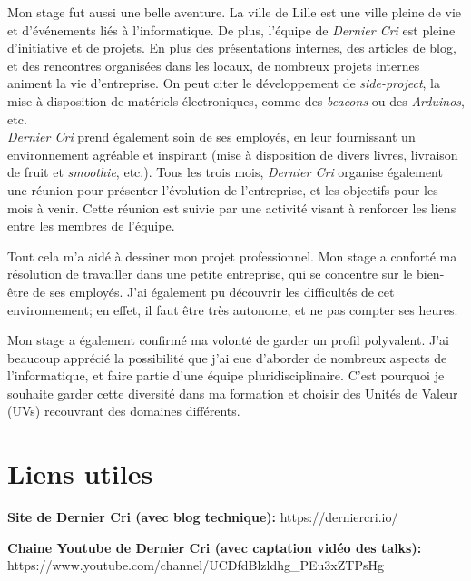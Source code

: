 \documentclass[12pt,a4paper]{article}
\begin{document}
  \bigskip

  Mon stage fut aussi une belle aventure. La ville de Lille est une ville
  pleine de vie et d'événements liés à l'informatique. De plus, l'équipe
  de \emph{Dernier Cri} est pleine d'initiative et de projets. En plus des
  présentations internes, des articles de blog, et des rencontres
  organisées dans les locaux, de nombreux projets internes animent la vie
  d'entreprise. On peut citer le développement de \emph{side-project}, la
  mise à disposition de matériels électroniques, comme des \emph{beacons}
  ou des \emph{Arduinos}, etc.\\
  \emph{Dernier Cri} prend également soin de ses employés, en leur
  fournissant un environnement agréable et inspirant (mise à disposition
  de divers livres, livraison de fruit et \emph{smoothie}, etc.). Tous les
  trois mois, \emph{Dernier Cri} organise également une réunion pour
  présenter l'évolution de l'entreprise, et les objectifs pour les mois à
  venir. Cette réunion est suivie par une activité visant à renforcer les
  liens entre les membres de l'équipe.

  \bigskip

  Tout cela m'a aidé à dessiner mon projet professionnel. Mon stage a
  conforté ma résolution de travailler dans une petite entreprise, qui se
  concentre sur le bien-être de ses employés. J'ai également pu découvrir
  les difficultés de cet environnement; en effet, il faut être très
  autonome, et ne pas compter ses heures.

  \bigskip

  Mon stage a également confirmé ma volonté de garder un profil
  polyvalent. J'ai beaucoup apprécié la possibilité que j'ai eue d'aborder
  de nombreux aspects de l'informatique, et faire partie d'une équipe
  pluridisciplinaire. C'est pourquoi je souhaite garder cette diversité
  dans ma formation et choisir des Unités de Valeur (UVs) recouvrant des
  domaines différents.

  \newpage

  \section{Liens utiles}\label{liens-utiles}

  \bigskip

  \textbf{Site de Dernier Cri (avec blog technique):}
  https://derniercri.io/

  \bigskip

  \textbf{Chaine Youtube de Dernier Cri (avec captation vidéo des talks):}
  https://www.youtube.com/channel/UCDfdBlzldhg\_PEu3xZTPsHg
\end{document}

